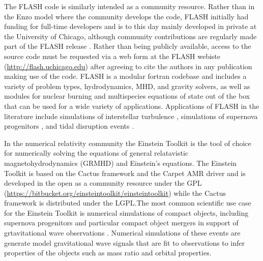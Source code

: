 \documentclass[11pt,twoside]{article}
\begin{document}

The FLASH code \citep{fryxell2000} is similarly intended as a community resource. Rather than in the Enzo model where the community develops the code, FLASH initially had funding for full-time developers and is to this day mainly developed in private at the University of Chicago, although community contributions are regularly made part of the FLASH release \citep{dubey2013}. Rather than being publicly available, access to the source code must be requested via a web form at the FLASH webiste (\url{http://flash.uchicago.edu}) after agreeing to cite the authors in any publication making use of the code. FLASH is a modular fortran codebase and includes a variety of problem types, hydrodynamics, MHD, and gravity solvers, as well as modules for nuclear burning and multispecies equations of state out of the box that can be used for a wide variety of applications. Applications of FLASH in the literature include simulations of interstellar turbulence \citep{federrath2013}, simulations of supernova progenitors \citep{couch2014}, and tidal disruption events \citep{guillochon2013}.


In the numerical relativity community the Einstein Toolkit \citep{loffler2012} is the tool of choice for numerically solving the equations of general relatavistic magnetohydrodynamics (GRMHD) and Einstein's equations. The Einstein Toolkit is based on the Cactus framework and the Carpet AMR driver and is developed in the open as a community resource under the GPL \citep{loffler2013} (\url{https://bitbucket.org/einsteintoolkit/einsteintoolkit}) while the Cactus framework is distributed under the LGPL.\@  The most common scientific use case for the Einstein Toolkit is numerical simulations of compact objects, including supernova progenitors \citep{mosta2014} and particular compact object mergers in support of grtavitational wave observations \citep{ajith2012}. Numerical simulations of these events are generate model gravitational wave signals that are fit to observations to infer properties of the objects such as mass ratio and orbital properties.
\end{document}
